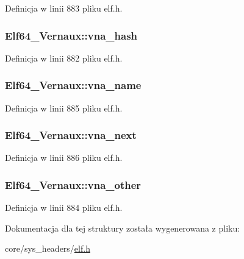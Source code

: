 Definicja w linii 883 pliku elf.\-h.

\hypertarget{struct_elf64___vernaux_ae41cce47b72e2232f3880843ab550649}{
\subsubsection[{vna\-\_\-hash}]{ Elf64\-\_\-\-Vernaux\-::vna\-\_\-hash}}\label{struct_elf64___vernaux_ae41cce47b72e2232f3880843ab550649}


Definicja w linii 882 pliku elf.\-h.

\hypertarget{struct_elf64___vernaux_a4c83e76a256ad7fe7058df7ee9493c5c}{
\subsubsection[{vna\-\_\-name}]{ Elf64\-\_\-\-Vernaux\-::vna\-\_\-name}}\label{struct_elf64___vernaux_a4c83e76a256ad7fe7058df7ee9493c5c}


Definicja w linii 885 pliku elf.\-h.

\hypertarget{struct_elf64___vernaux_a565bd1e8b3ae2f45854f8163629444fc}{
\subsubsection[{vna\-\_\-next}]{ Elf64\-\_\-\-Vernaux\-::vna\-\_\-next}}\label{struct_elf64___vernaux_a565bd1e8b3ae2f45854f8163629444fc}


Definicja w linii 886 pliku elf.\-h.

\hypertarget{struct_elf64___vernaux_a56e3d7fee69c7b55556297757e1977e5}{
\subsubsection[{vna\-\_\-other}]{ Elf64\-\_\-\-Vernaux\-::vna\-\_\-other}}\label{struct_elf64___vernaux_a56e3d7fee69c7b55556297757e1977e5}


Definicja w linii 884 pliku elf.\-h.



Dokumentacja dla tej struktury została wygenerowana z pliku\-:\begin{DoxyCompactItemize}
\item 
core/sys\-\_\-headers/\hyperlink{elf_8h}{elf.\-h}\end{DoxyCompactItemize}
